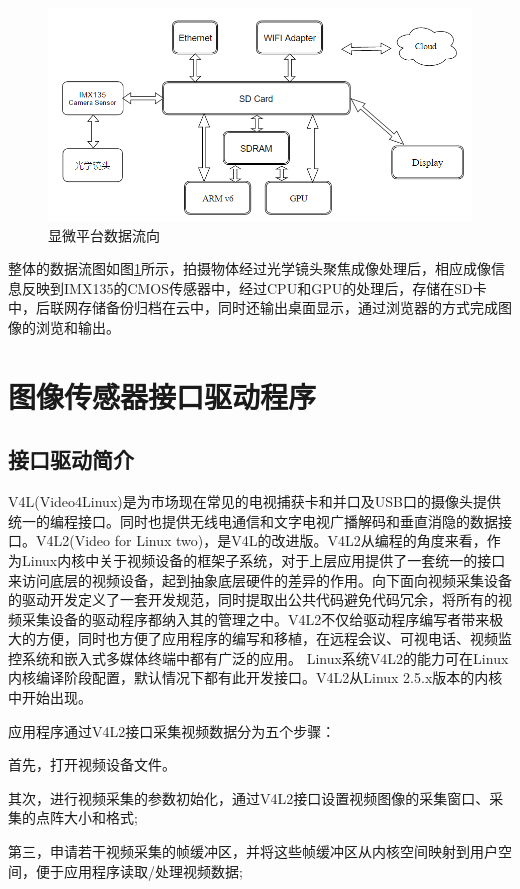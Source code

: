 \begin{figure}[h]
\centering
\includegraphics[width=0.7\linewidth]{Figure/rasp_arch_1}
\caption{显微平台数据流向}
\label{fig:rasp_arch_1}
\end{figure}


整体的数据流图如图\ref{fig:rasp_arch_1}所示，拍摄物体经过光学镜头聚焦成像处理后，相应成像信息反映到IMX135的CMOS传感器中，经过CPU和GPU的处理后，存储在SD卡中，后联网存储备份归档在云中，同时还输出桌面显示，通过浏览器的方式完成图像的浏览和输出。


\section{图像传感器接口驱动程序}
\subsection{接口驱动简介}
V4L(Video4Linux)是为市场现在常见的电视捕获卡和并口及USB口的摄像头提供统一的编程接口。同时也提供无线电通信和文字电视广播解码和垂直消隐的数据接口。V4L2(Video for Linux two)，是V4L的改进版。V4L2从编程的角度来看，作为Linux内核中关于视频设备的框架子系统，对于上层应用提供了一套统一的接口来访问底层的视频设备，起到抽象底层硬件的差异的作用。向下面向视频采集设备的驱动开发定义了一套开发规范，同时提取出公共代码避免代码冗余，将所有的视频采集设备的驱动程序都纳入其的管理之中。V4L2不仅给驱动程序编写者带来极大的方便，同时也方便了应用程序的编写和移植，在远程会议、可视电话、视频监控系统和嵌入式多媒体终端中都有广泛的应用。\cite{v4l2embedded}
Linux系统V4L2的能力可在Linux内核编译阶段配置，默认情况下都有此开发接口。V4L2从Linux 2.5.x版本的内核中开始出现。

应用程序通过V4L2接口采集视频数据分为五个步骤：

首先，打开视频设备文件。

其次，进行视频采集的参数初始化，通过V4L2接口设置视频图像的采集窗口、采集的点阵大小和格式;

第三，申请若干视频采集的帧缓冲区，并将这些帧缓冲区从内核空间映射到用户空间，便于应用程序读取/处理视频数据;

